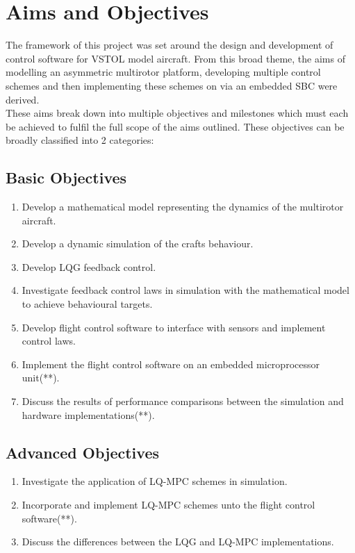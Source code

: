 \documentclass[12pt,a4paper,twoside]{report}
\begin{document}
		\section{Aims and Objectives}
			
			The framework of this project was set around the design and development of control software for VSTOL model aircraft. From this broad theme, the aims of modelling an asymmetric multirotor platform, developing multiple control schemes and then implementing these schemes on via an embedded SBC were derived.
			\\
			These aims break down into multiple objectives and milestones which must each be achieved to fulfil the full scope of the aims outlined. These objectives can be broadly classified into 2 categories: 
	
				\subsection{Basic Objectives}
				
					\begin{enumerate}
						\item
							Develop a mathematical model representing the dynamics of the multirotor aircraft.
						\item
							Develop a dynamic simulation of the crafts behaviour.
						\item
							Develop LQG feedback control.
						\item
							Investigate feedback control laws in simulation with the mathematical model to achieve behavioural targets.
						\item
							Develop flight control software to interface with sensors and implement control laws.
						\item
							Implement the flight control software on an embedded microprocessor unit(**).
						\item
							Discuss the results of performance comparisons between the simulation and hardware implementations(**).
					\end{enumerate}
				
				\subsection{Advanced Objectives}
				
					\begin{enumerate}
						\item
							Investigate the application of LQ-MPC schemes in simulation.
						\item	
							Incorporate and implement LQ-MPC schemes unto the flight control software(**).
						\item	
							Discuss the differences between the LQG and LQ-MPC implementations.
					\end{enumerate}
				
\end{document}
